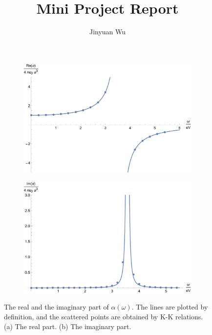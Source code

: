 \documentclass[hyperref, a4paper]{article}
\title{Mini Project Report}
\author{Jinyuan Wu}
\begin{document}
\maketitle

\begin{figure}
    \centering
    \begin{subfigure}{0.45\textwidth}
        \includegraphics[width=\textwidth]{alpha-re.pdf}
        \subcaption{}
    \end{subfigure}
    \begin{subfigure}{0.45\textwidth}
        \includegraphics[width=\textwidth]{alpha-im.pdf}
        \subcaption{}
    \end{subfigure}
    \caption{The real and the imaginary part of $\alpha(\omega)$. The lines are plotted by definition, and the scattered points are obtained by K-K relations. (a) The real part. (b) The imaginary part.}
    \label{fig:plot}
\end{figure}
\end{document}
